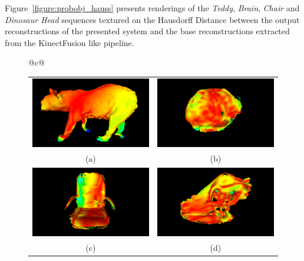 Figure~\ref{figure:probobj_hauss} presents renderings of the \textit{Teddy}, 
\textit{Brain}, \textit{Chair} and \textit{Dinosaur Head} sequences textured 
on the Hausdorff Distance between the output reconstructions of the presented 
system and the base reconstructions extracted from the KinectFusion like pipeline.
\begin{figure}[!htbp]
  \centering
  \begin{tabular}{@{}c@{}}
    \begin{tabular}{cc}
      \includegraphics[width=.4\linewidth]{figures/object_recon/hauss/bear.png}&
      \includegraphics[width=.4\linewidth]{figures/object_recon/hauss/brain.png}\\
      (a) & (b) \\
      \includegraphics[width=.4\linewidth]{figures/object_recon/hauss/chair.png}&
      \includegraphics[width=.4\linewidth]{figures/object_recon/hauss/dino.png} \\
      (c) & (d) \\
    \end{tabular} \\
    \begin{tabular}{ccc}

\end{tabular}
\end{tabular}
\end{figure}
